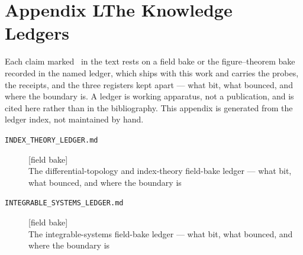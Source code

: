 \clearpage
\section*{Appendix L\quad The Knowledge Ledgers}\label{app:ledgers}
\small\noindent Each claim marked \ldgmarker\ in the text rests on a field bake or the figure--theorem bake recorded in the named ledger, which ships with this work and carries the probes, the receipts, and the three registers kept apart --- what bit, what bounced, and where the boundary is. A ledger is working apparatus, not a publication, and is cited here rather than in the bibliography. This appendix is generated from the ledger index, not maintained by hand.\par\medskip
\begingroup\renewcommand{\arraystretch}{1.25}
\begin{description}
\item[\label{ldg:index_theory}\texttt{INDEX\_THEORY\_LEDGER.md}]\hfill\textsf{[field bake]}\\
The differential-topology and index-theory field-bake ledger --- what bit, what bounced, and where the boundary is
\item[\label{ldg:integrable_systems}\texttt{INTEGRABLE\_SYSTEMS\_LEDGER.md}]\hfill\textsf{[field bake]}\\
The integrable-systems field-bake ledger --- what bit, what bounced, and where the boundary is
\end{description}
\endgroup
